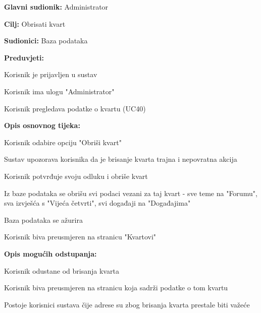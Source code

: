 					\noindent {}
					\begin{packed_item}
	
						\item \textbf{Glavni sudionik: }Administrator
						\item  \textbf{Cilj:} Obrisati kvart
						\item  \textbf{Sudionici:} Baza podataka
						\item  \textbf{Preduvjeti:}
						\item[] \begin{packed_enum}
							\item Korisnik je prijavljen u sustav
							\item Korisnik ima ulogu "Administrator"
							\item Korisnik pregledava podatke o kvartu (UC40)
						\end{packed_enum}
						\item  \textbf{Opis osnovnog tijeka:}
						
						\item[] \begin{packed_enum}
	
							\item Korisnik odabire opciju "Obriši kvart"
							\item Sustav upozorava korisnika da je brisanje kvarta trajna i nepovratna akcija
							\item Korisnik potvrđuje svoju odluku i obriše kvart
							\item Iz baze podataka se obrišu svi podaci vezani za taj kvart - sve teme na "Forumu", sva izvješća s "Vijeća četvrti", svi događaji na "Događajima"
							\item Baza podataka se ažurira
							\item Korisnik biva preusmjeren na stranicu "Kvartovi"
						\end{packed_enum}
						
						\item  \textbf{Opis mogućih odstupanja:}
						
						\item[] \begin{packed_item}
	
							\item[3.a] Korisnik odustane od brisanja kvarta
							\item[] \begin{packed_enum}
								
								\item Korisnik biva preusmjeren na stranicu koja sadrži podatke o tom kvartu
								\end{packed_enum}
							\item[4.a] Postoje korisnici sustava čije adrese su zbog brisanja kvarta prestale biti važeće
							\item[] \begin{packed_enum}
								

\end{packed_enum}
\end{packed_item}
\end{packed_item}

